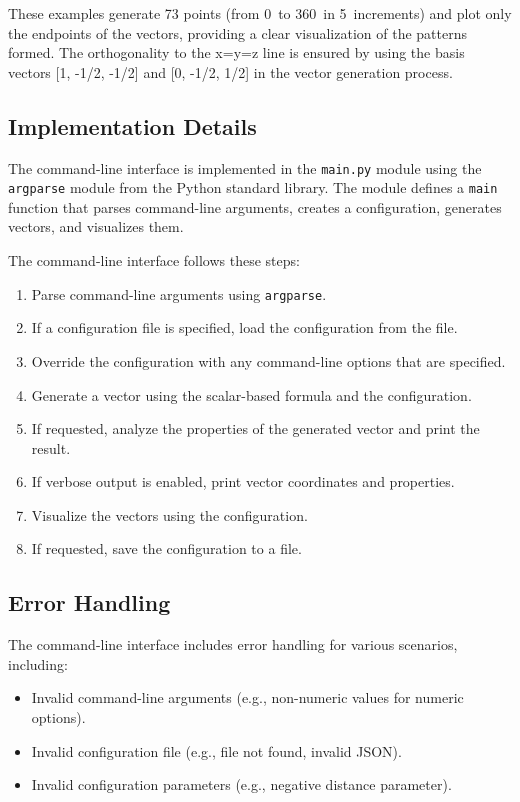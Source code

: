 These examples generate 73 points (from 0\textdegree\ to 360\textdegree\ in 5\textdegree\ increments) and plot only the endpoints of the vectors, providing a clear visualization of the patterns formed. The orthogonality to the x=y=z line is ensured by using the basis vectors [1, -1/2, -1/2] and [0, -1/2, 1/2] in the vector generation process.

\subsection{Implementation Details}

The command-line interface is implemented in the \texttt{main.py} module using the \texttt{argparse} module from the Python standard library. The module defines a \texttt{main} function that parses command-line arguments, creates a configuration, generates vectors, and visualizes them.

The command-line interface follows these steps:

\begin{enumerate}
    \item Parse command-line arguments using \texttt{argparse}.
    \item If a configuration file is specified, load the configuration from the file.
    \item Override the configuration with any command-line options that are specified.
    \item Generate a vector using the scalar-based formula and the configuration.
    \item If requested, analyze the properties of the generated vector and print the result.
    \item If verbose output is enabled, print vector coordinates and properties.
    \item Visualize the vectors using the configuration.
    \item If requested, save the configuration to a file.
\end{enumerate}

\subsection{Error Handling}

The command-line interface includes error handling for various scenarios, including:

\begin{itemize}
    \item Invalid command-line arguments (e.g., non-numeric values for numeric options).
    \item Invalid configuration file (e.g., file not found, invalid JSON).
    \item Invalid configuration parameters (e.g., negative distance parameter).
\end{itemize}

